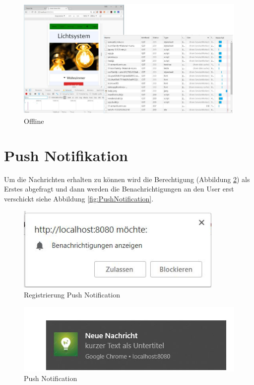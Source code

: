\begin{figure}[h]
	\centering
	\includegraphics[width=14cm]{BilderAllgemein/Offline}\medskip
	\caption{Offline}
	\label{fig:Offline}
\end{figure}

\newpage

\section{Push Notifikation}
Um die Nachrichten erhalten zu können wird die Berechtigung (Abbildung \ref{fig:Registrierung}) als Erstes abgefragt und dann werden die Benachrichtigungen an den User erst verschickt siehe Abbildung \ref{fig:PushNotification}.

\begin{figure}[h]
	\centering
	\includegraphics[width=10cm]{BilderAllgemein/PushNotification/Registrierung}\medskip
	\caption{Registrierung Push Notification}
	\label{fig:Registrierung}
\end{figure}

\begin{figure}[h]
	\centering
	\includegraphics[width=14cm]{BilderAllgemein/PushNotification/Nachricht}\medskip
	\caption{Push Notification}
	\label{fig:Nachricht}
\end{figure}


